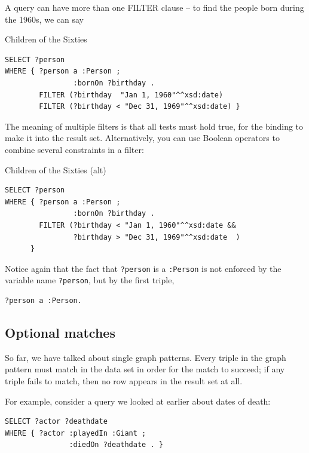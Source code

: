 A query can have more than one FILTER clause -- to find the people born
during the 1960s, we can say

\begin{query}Children of the Sixties\end{query}
\begin{lstlisting}
SELECT ?person
WHERE { ?person a :Person ;
                :bornOn ?birthday .
        FILTER (?birthday  "Jan 1, 1960"^^xsd:date)
        FILTER (?birthday < "Dec 31, 1969"^^xsd:date) }
\end{lstlisting}


The meaning of multiple filters is that all tests must hold true, for
the binding to make it into the result set. Alternatively, you can use
Boolean operators to combine several constraints in a filter:

\begin{query}Children of the Sixties (alt)\end{query}
\begin{lstlisting}
SELECT ?person
WHERE { ?person a :Person ;
                :bornOn ?birthday .
        FILTER (?birthday < "Jan 1, 1960"^^xsd:date &&
                ?birthday > "Dec 31, 1969"^^xsd:date  )
      }
\end{lstlisting}

Notice again that the fact that \texttt{?person} is a \texttt{:Person} is not enforced by
the variable name \texttt{?person}, but by the first triple,

\begin{lstlisting}
?person a :Person.
\end{lstlisting}

\subsection{Optional matches}

So far, we have talked about single graph patterns. Every triple in the
graph pattern must match in the data set in order for the match to
succeed; if any triple fails to match, then no row appears in the result
set at all.

For example, consider a query we looked at earlier about dates of death:



\begin{lstlisting}
SELECT ?actor ?deathdate
WHERE { ?actor :playedIn :Giant ;
               :diedOn ?deathdate . }
\end{lstlisting}


